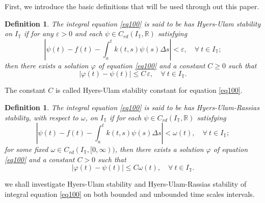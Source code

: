 \documentclass{article}
\newtheorem{defn}[thm]{Definition}
\newcommand{\q}{\quad}
\begin{document}
First, we introduce the basic definitions that will be used through out this paper.
\begin{defn}
The integral equation \eqref{eq100} is said to be has\emph{ Hyers-Ulam stability} on $I_\mathbb{T}$ if for any $\varepsilon>0$ and each $\psi\in C_{rd}(I_\mathbb{T},\mathbb{R})$ satisfying
$$
|\psi(t)-f(t)-\int_a^tk(t,s)\psi(s)\Delta s|<\varepsilon, \q \forall \ t \in I_\mathbb{T};
$$
then there exists a solution $\varphi$ of equation \eqref{eq100} and a constant $C\geq0$ such that
$$
|\varphi(t)-\psi(t)|\leq C\,\varepsilon, \q \forall \ t \in I_\mathbb{T}.
$$
\end{defn}
The constant $C$ is called Hyers-Ulam stability constant for equation \eqref{eq100}.
\begin{defn}
The integral equation \eqref{eq100} is said to be has\emph{ Hyers-Ulam-Rassias stability}, with respect to $\omega$, on $I_\mathbb{T}$ if for each  $\psi\in C_{rd}(I_\mathbb{T},\mathbb{R})$ satisfying
$$
|\psi(t)-f(t)-\int_a^tk(t,s)\psi(s)\Delta s|<\omega(t), \q \forall \ t \in I_\mathbb{T};
$$
for some fixed $\omega\in C_{rd}(I_\mathbb{T},[0,\infty))$, then there exists a solution $\varphi$ of equation \eqref{eq100} and a constant $C>0$  such that
$$
|\varphi(t)-\psi(t)|\leq C \omega(t),\q \forall \ t \in I_\mathbb{T}.
$$
\end{defn}

 we shall investigate Hyers-Ulam stability and Hyers-Ulam-Rassias stability of integral equation \eqref{eq100} on both bounded and unbounded time scales intervals.
\end{document}
